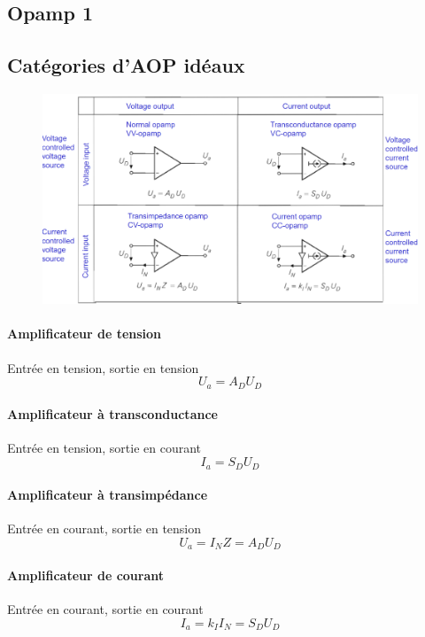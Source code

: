 \documentclass[resume]{subfiles}
\begin{document}
\begin{multicols}{3}
\section{Opamp 1}


\subsection{Catégories d'AOP idéaux}
\begin{figure}[H]
    \centering
    \includegraphics[width=\columnwidth]{../images/OpAmp1/categoriesAOP.png}
\end{figure}
\paragraph{Amplificateur de tension} Entrée en tension, sortie en tension
$$U_a=A_DU_D$$
\paragraph{Amplificateur à transconductance} Entrée en tension, sortie en courant
$$I_a=S_DU_D$$
\paragraph{Amplificateur à transimpédance} Entrée en courant, sortie en tension
$$U_a=I_NZ=A_DU_D$$
\paragraph{Amplificateur de courant} Entrée en courant, sortie en courant
$$I_a=k_II_N=S_DU_D$$

\end{multicols}
\end{document}
